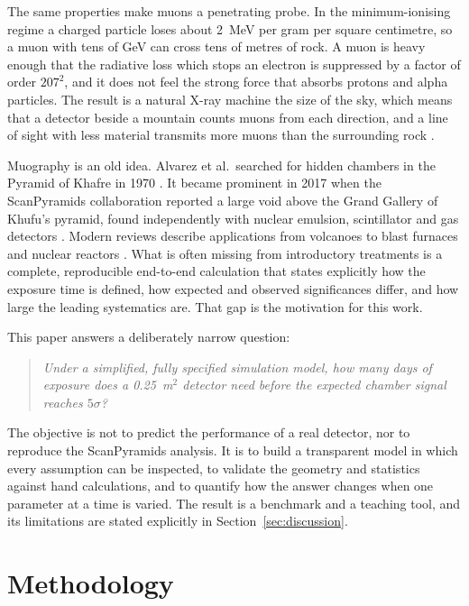 \documentclass{article}
\begin{document}
The same properties make muons a penetrating probe. In the minimum-ionising
regime a charged particle loses about 2~MeV per gram per square centimetre, so
a muon with tens of GeV can cross tens of metres of rock. A muon is heavy
enough that the radiative loss which stops an electron is suppressed by a
factor of order $207^2$, and it does not feel the strong force that absorbs
protons and alpha particles. The result is a natural X-ray machine the size of
the sky, which means that a detector beside a mountain counts muons from each direction, and a
line of sight with less material transmits more muons than the surrounding
rock \cite{bonomi2020,pdg2024}.

Muography is an old idea. Alvarez et al.\ searched for hidden chambers in the
Pyramid of Khafre in 1970 \cite{alvarez1970}. It became prominent in 2017 when
the ScanPyramids collaboration reported a large void above the Grand Gallery of
Khufu's pyramid, found independently with nuclear emulsion, scintillator and
gas detectors \cite{morishima2017}. Modern reviews describe applications from
volcanoes to blast furnaces and nuclear reactors \cite{bonomi2020}. What is
often missing from introductory treatments is a complete, reproducible
end-to-end calculation that states explicitly how the exposure time is defined,
how expected and observed significances differ, and how large the leading
systematics are. That gap is the motivation for this work.

This paper answers a deliberately narrow question:

\begin{quote}
\emph{Under a simplified, fully specified simulation model, how many days of
exposure does a 0.25~m$^2$ detector need before the expected chamber signal
reaches $5\sigma$?}
\end{quote}

The objective is not to predict the performance of a real detector, nor to
reproduce the ScanPyramids analysis. It is to build a transparent model in
which every assumption can be inspected, to validate the geometry and
statistics against hand calculations, and to quantify how the answer changes
when one parameter at a time is varied. The result is a benchmark and a
teaching tool, and its limitations are stated explicitly in
Section~\ref{sec:discussion}.


\section{Methodology}
\label{sec:method}
\end{document}
